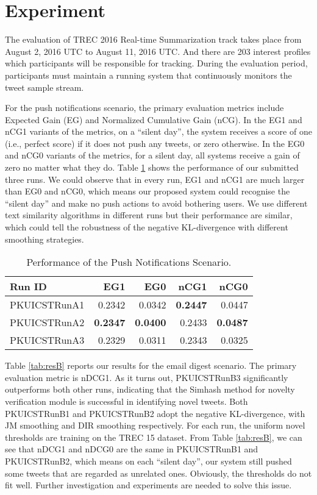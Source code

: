 \section{Experiment}
The evaluation of TREC 2016 Real-time Summarization track takes place from
August 2, 2016 UTC to August 11, 2016 UTC.
And there are 203 interest profiles which participants will be responsible for tracking.
During the evaluation period, participants must maintain a running system
that continuously monitors the tweet sample stream.

For the push notifications scenario, the primary evaluation metrics
include Expected Gain (EG) and Normalized Cumulative Gain (nCG).
In the EG1 and nCG1 variants of the metrics, on a ``silent day'',
the system receives a score of one (i.e., perfect score) if it does not push any tweets,
or zero otherwise. In the EG0 and nCG0 variants of the metrics, for a silent day,
all systems receive a gain of zero no matter what they do.
Table \ref{tab:resA} shows the performance of our submitted three runs.
We could observe that in every run, EG1 and nCG1 are much larger than EG0 and nCG0,
which means our proposed system could recognise the ``silent day''
and make no push actions to avoid bothering users.
We use different text similarity algorithms in different runs
but their performance are similar, which could tell the robustness
of the negative KL-divergence with different smoothing strategies.

\begin{table}[htbp]
\centering
\caption{Performance of the Push Notifications Scenario.}
\label{tab:resA}
\begin{tabular}{lrrrr}
\hline
Run ID&EG1&EG0&nCG1&nCG0\\
\hline
PKUICSTRunA1&0.2342&0.0342&\textbf{0.2447}&0.0447\\
PKUICSTRunA2&\textbf{0.2347}&\textbf{0.0400}&0.2433&\textbf{0.0487}\\
PKUICSTRunA3&0.2329&0.0311&0.2343&0.0325\\
\hline
\end{tabular}
\end{table}

Table \ref{tab:resB} reports our results for the email digest scenario.
The primary evaluation metric is nDCG1.
As it turns out, PKUICSTRunB3 significantly outperforms both other runs,
indicating that the Simhash method for novelty verification module is successful in identifying novel tweets.
Both PKUICSTRunB1 and PKUICSTRunB2 adopt the negative KL-divergence,
with JM smoothing and DIR smoothing respectively.
For each run, the uniform novel thresholds are training on the TREC 15 dataset.
From Table \ref{tab:resB}, we can see that nDCG1 and nDCG0 are the same in PKUICSTRunB1 and PKUICSTRunB2,
which means on each ``silent day'', our system still pushed some tweets that are regarded as unrelated ones.
Obviously, the thresholds do not fit well.
Further investigation and experiments are needed to solve this issue.


